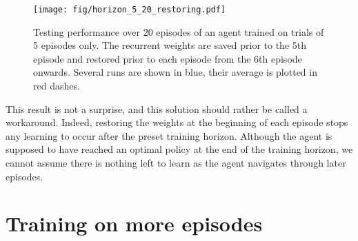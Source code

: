 \begin{figure}
	\centering
	\texttt{[image: fig/horizon\_5\_20\_restoring.pdf]}
	\caption{Testing performance over 20 episodes of an agent trained on 
	trials of 5 episodes only. The recurrent weights are saved prior to 
	the 5th episode and restored prior to each episode from the 6th episode
	onwards. Several runs are shown in blue, their average is plotted in
	red dashes.}
	\label{fig:horizon_5_20_restoring}
\end{figure}

This result is not a surprise, and this solution should rather be called a 
workaround. Indeed, restoring the weights at the beginning of each episode
stops any learning to occur after the preset training horizon. Although the
agent is supposed to have reached an optimal policy at the end of the training
horizon, we cannot assume there is nothing left to learn as the agent navigates
through later episodes.

\section{Training on more episodes}

